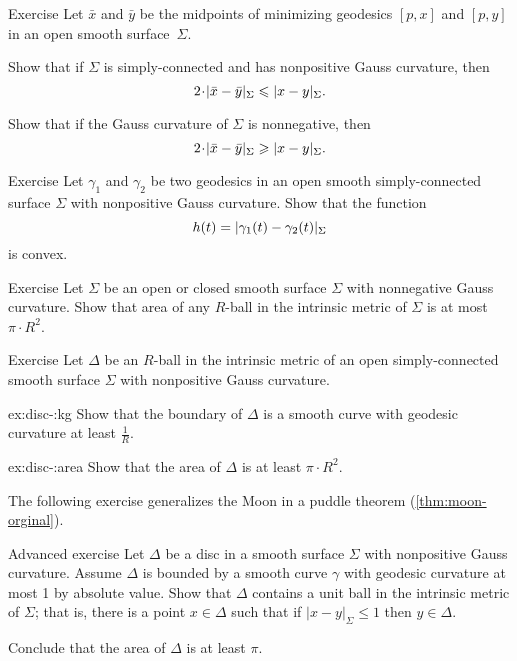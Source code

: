 \begin{thm}{Exercise}\label{ex:midpoints}
Let $\bar x$ and $\bar y$ be the midpoints of minimizing geodesics $[p,x]$ and $[p,y]$ in an open smooth surface~$\Sigma$.

\begin{subthm}{}
Show that if $\Sigma$ is simply-connected and has nonpositive Gauss curvature, then 
\[2\cdot \dist{\bar x}{\bar y}\Sigma\le \dist{x}{y}\Sigma.\]
\end{subthm}
 
\begin{subthm}{} Show that if the Gauss curvature of $\Sigma$ is nonnegative, then 
 \[2\cdot \dist{\bar x}{\bar y}\Sigma\ge \dist{x}{y}\Sigma.\]
\end{subthm}

\end{thm}

\begin{thm}{Exercise}\label{ex:convex-dist}
Let $\gamma_1$ and $\gamma_2$ be two geodesics in an open smooth simply-connected surface $\Sigma$ with nonpositive Gauss curvature.
Show that the function
\[h(t)=\dist{\gamma_1(t)}{\gamma_2(t)}\Sigma\]
is convex.
\end{thm}

\begin{thm}{Exercise}\label{ex:disc+}
Let $\Sigma$ be an open or closed smooth surface $\Sigma$ with nonnegative Gauss curvature.
Show that area of any $R$-ball in the intrinsic metric of $\Sigma$ is at most $\pi\cdot R^2$.

\end{thm}

\begin{thm}{Exercise}\label{ex:disc-}
Let $\Delta$ be an $R$-ball in the intrinsic metric of an open simply-connected smooth surface $\Sigma$  with nonpositive Gauss curvature.

\begin{subthm}{ex:disc-:kg}
Show that the boundary of $\Delta$ is a smooth curve with geodesic curvature at least $\tfrac1R$.
\end{subthm}

\begin{subthm}{ex:disc-:area}
Show that the area of $\Delta$ is at least $\pi\cdot R^2$.
\end{subthm}

\end{thm}

The following exercise generalizes the Moon in a puddle theorem (\ref{thm:moon-orginal}).

\begin{thm}{Advanced exercise}\label{ex:moon-}
Let $\Delta$ be a disc in a smooth surface $\Sigma$ with nonpositive Gauss curvature.
Assume $\Delta$ is bounded by a smooth curve $\gamma$ with geodesic curvature at most 1 by absolute value.
Show that $\Delta$ contains a unit ball in the intrinsic metric of $\Sigma$;
that is, there is a point $x\in \Delta$ such that if $|x-y|_\Sigma\le 1$ then $y\in\Delta$.

Conclude that the area of $\Delta$ is at least $\pi$.
\end{thm}

